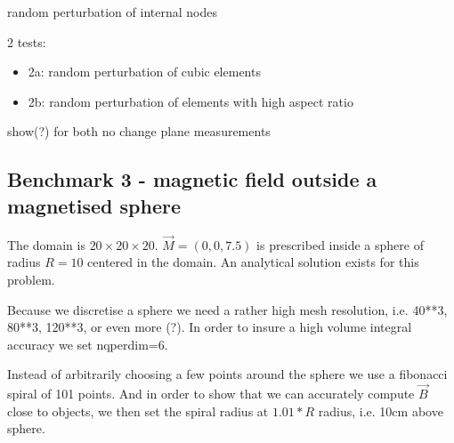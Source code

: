 random perturbation of internal nodes


2 tests:
\begin{itemize}
\item 2a: random perturbation of cubic elements 
\item 2b: random perturbation of elements with high aspect ratio
\end{itemize}
show(?) for both no change plane measurements






\subsection*{Benchmark 3 - magnetic field outside a magnetised sphere}

The domain is $20\times 20\times 20$. 
$\vec{M}=(0,0,7.5)$ is prescribed inside a sphere of radius $R=10$ centered 
in the domain. 
An analytical solution exists for this problem.

Because we discretise a sphere we need a rather high mesh resolution,
i.e. 40**3, 80**3, 120**3, or even more (?).
In order to insure a high volume integral accuracy we set nqperdim=6.

Instead of arbitrarily choosing a few points around the sphere
we use a fibonacci spiral of 101 points. 
And in order to show that we can accurately
compute $\vec{B}$ close to objects, 
we then set the spiral radius at $1.01*R$ radius, i.e. 10cm above sphere.



